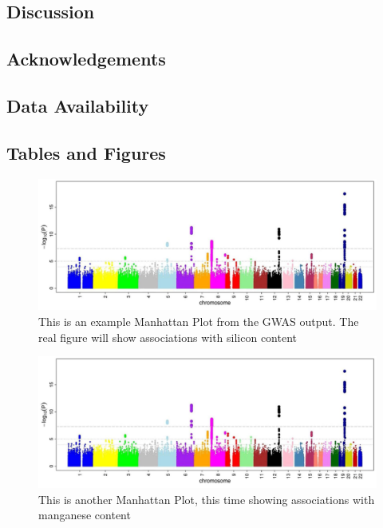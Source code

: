 \documentclass[12pt, letterpaper, ]{article}
\begin{document}
\subsection{Discussion}

\subsection{Acknowledgements}

\subsection{Data Availability}

\subsection{Tables and Figures}

\begin{figure}[h]
        \includegraphics{images/Manhattan_Plot.png}
        \centering
        \caption{This is an example Manhattan Plot from the GWAS output. The real figure will show associations with silicon content}
        \label{Fig:si_peak_plot}
\end{figure}
\begin{figure}[h]
        \includegraphics{images/Manhattan_Plot.png}
        \centering
        \caption{This is another Manhattan Plot, this time showing associations with manganese content}
        \label{Fig:mn_peak_plot}
\end{figure}
\end{document}
